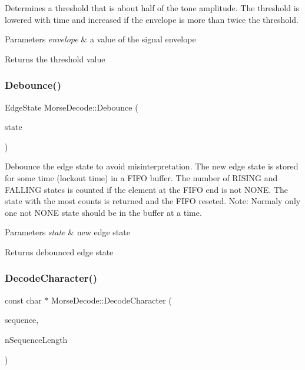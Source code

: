 Determines a threshold that is about half of the tone amplitude. The threshold is lowered with time and increased if the envelope is more than twice the threshold. 


\begin{DoxyParams}{Parameters}
{\em envelope} & a value of the signal envelope \\
\hline
\end{DoxyParams}
\begin{DoxyReturn}{Returns}
the threshold value 
\end{DoxyReturn}
\mbox{\label{classMorseDecode_af7e53eff848faf9e57bb7ae660f2911b}} 
\subsubsection{\texorpdfstring{Debounce()}{Debounce()}}
{\footnotesize\ttfamily Edge\+State Morse\+Decode\+::\+Debounce (\begin{DoxyParamCaption}\item[{Morse\+::\+Edge\+State}]{state }\end{DoxyParamCaption})\hspace{0.3cm}{\ttfamily [private]}}



Debounce the edge state to avoid misinterpretation. The new edge state is stored for some time (lockout time) in a F\+I\+FO buffer. The number of R\+I\+S\+I\+NG and F\+A\+L\+L\+I\+NG states is counted if the element at the F\+I\+FO end is not N\+O\+NE. The state with the most counts is returned and the F\+I\+FO reseted. Note\+: Normaly only one not N\+O\+NE state should be in the buffer at a time. 


\begin{DoxyParams}{Parameters}
{\em state} & new edge state \\
\hline
\end{DoxyParams}
\begin{DoxyReturn}{Returns}
debounced edge state 
\end{DoxyReturn}
\mbox{\label{classMorseDecode_a3ff969902811aa7eefbccb027d0cbcda}} 
\subsubsection{\texorpdfstring{Decode\+Character()}{DecodeCharacter()}}
{\footnotesize\ttfamily const char $\ast$ Morse\+Decode\+::\+Decode\+Character (\begin{DoxyParamCaption}\item[{uint16\+\_\+t}]{sequence,  }\item[{int}]{n\+Sequence\+Length }\end{DoxyParamCaption})\hspace{0.3cm}{\ttfamily [private]}}



